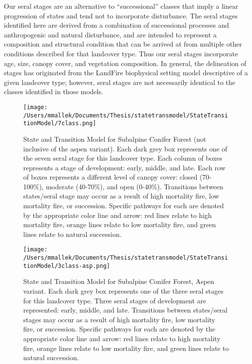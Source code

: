 Our seral stages are an alternative to ``successional'' classes that imply a linear progression of states and tend not to incorporate disturbance. The seral stages identified here are derived from a combination of successional processes and anthropogenic and natural disturbance, and are intended to represent a composition and structural condition that can be arrived at from multiple other conditions described for that landcover type. Thus our seral stages incorporate age, size, canopy cover, and vegetation composition. In general, the delineation of stages has originated from the LandFire biophysical setting model descriptive of a given landcover type; however, seral stages are not necessarily identical to the classes identified in those models.


\begin{figure}[htbp]
\centering
\texttt{[image: /Users/mmallek/Documents/Thesis/statetransmodel/StateTransitionModel/7class.png]}
\caption{State and Transition Model for Subalpine Conifer Forest (not inclusive of the aspen variant). Each dark grey box represents one of the seven seral stage for this landcover type. Each column of boxes represents a stage of development: early, middle, and late. Each row of boxes represents a different level of canopy cover: closed (70-100\%), moderate (40-70\%), and open (0-40\%). Transitions between states/seral stage may occur as a result of high mortality fire, low mortality fire, or succession. Specific pathways for each are denoted by the appropriate color line and arrow: red lines relate to high mortality fire, orange lines relate to low mortality fire, and green lines relate to natural succession.} 
\label{transmodel_scn}
\end{figure}

\begin{figure}[htbp]
\centering
\texttt{[image: /Users/mmallek/Documents/Thesis/statetransmodel/StateTransitionModel/3class-asp.png]}
\caption{State and Transition Model for Subalpine Conifer Forest, Aspen variant. Each dark grey box represents one of the three seral stages for this landcover type. Three seral stages of development are represented: early, middle, and late. Transitions between states/seral stages may occur as a result of high mortality fire, low mortality fire, or succession. Specific pathways for each are denoted by the appropriate color line and arrow: red lines relate to high mortality fire, orange lines relate to low mortality fire, and green lines relate to natural succession.} 
\label{transmodel_scn-asp}
\end{figure}

